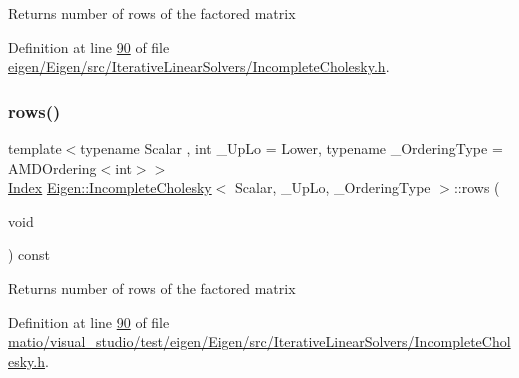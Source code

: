 \begin{DoxyReturn}{Returns}
number of rows of the factored matrix 
\end{DoxyReturn}


Definition at line \hyperlink{eigen_2_eigen_2src_2_iterative_linear_solvers_2_incomplete_cholesky_8h_source_l00090}{90} of file \hyperlink{eigen_2_eigen_2src_2_iterative_linear_solvers_2_incomplete_cholesky_8h_source}{eigen/\+Eigen/src/\+Iterative\+Linear\+Solvers/\+Incomplete\+Cholesky.\+h}.

\mbox{\label{class_eigen_1_1_incomplete_cholesky_a4780a83266c871782595081021268b5a}} 
\subsubsection{\texorpdfstring{rows()}{rows()}\hspace{0.1cm}{\footnotesize\ttfamily [2/2]}}
{\footnotesize\ttfamily template$<$typename Scalar , int \+\_\+\+Up\+Lo = Lower, typename \+\_\+\+Ordering\+Type  = A\+M\+D\+Ordering$<$int$>$$>$ \\
\hyperlink{namespace_eigen_a62e77e0933482dafde8fe197d9a2cfde}{Index} \hyperlink{class_eigen_1_1_incomplete_cholesky}{Eigen\+::\+Incomplete\+Cholesky}$<$ Scalar, \+\_\+\+Up\+Lo, \+\_\+\+Ordering\+Type $>$\+::rows (\begin{DoxyParamCaption}\item[{void}]{ }\end{DoxyParamCaption}) const\hspace{0.3cm}{\ttfamily [inline]}}

\begin{DoxyReturn}{Returns}
number of rows of the factored matrix 
\end{DoxyReturn}


Definition at line \hyperlink{matio_2visual__studio_2test_2eigen_2_eigen_2src_2_iterative_linear_solvers_2_incomplete_cholesky_8h_source_l00090}{90} of file \hyperlink{matio_2visual__studio_2test_2eigen_2_eigen_2src_2_iterative_linear_solvers_2_incomplete_cholesky_8h_source}{matio/visual\+\_\+studio/test/eigen/\+Eigen/src/\+Iterative\+Linear\+Solvers/\+Incomplete\+Cholesky.\+h}.

\mbox{\label{class_eigen_1_1_incomplete_cholesky_a30d66dd77147a84ec3302e7d5fe5d924}} 
